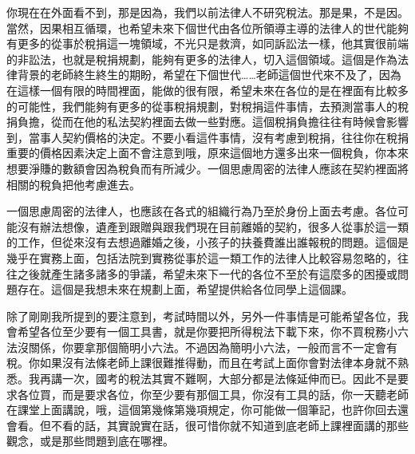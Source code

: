 \documentclass[]{ctexbook}
\begin{document}
你現在在外面看不到，那是因為，我們以前法律人不研究稅法。那是果，不是因。當然，因果相互循環，也希望未來下個世代由各位所領導主導的法律人的世代能夠有更多的從事於稅捐這一塊領域，不光只是救濟，如同訴訟法一樣，他其實很前端的非訟法，也就是稅捐規劃，能夠有更多的法律人，切入這個領域。這個是作為法律背景的老師終生終生的期盼，希望在下個世代\ldots\ldots 老師這個世代來不及了，因為在這樣一個有限的時間裡面，能做的很有限，希望未來在各位的是在裡面有比較多的可能性，我們能夠有更多的從事稅捐規劃，對稅捐這件事情，去預測當事人的稅捐負擔，從而在他的私法契約裡面去做一些對應。這個稅捐負擔往往有時候會影響到，當事人契約價格的決定。不要小看這件事情，沒有考慮到稅捐，往往你在稅捐重要的價格因素決定上面不會注意到哦，原來這個地方還多出來一個稅負，你本來想要淨賺的數額會因為稅負而有所減少。一個思慮周密的法律人應該在契約裡面將相關的稅負把他考慮進去。

一個思慮周密的法律人，也應該在各式的組織行為乃至於身份上面去考慮。各位可能沒有辦法想像，遺產到跟贈與跟我們現在目前離婚的契約，很多人從事於這一類的工作，但從來沒有去想過離婚之後，小孩子的扶養費誰出誰報稅的問題。這個是幾乎在實務上面，包括法院到實務從事於這一類工作的法律人比較容易忽略的，往往之後就產生諸多諸多的爭議，希望未來下一代的各位不至於有這麼多的困擾或問題存在。這個是我想未來在規劃上面，希望提供給各位同學上這個課。

除了剛剛我所提到的要注意到，考試時間以外，另外一件事情是可能希望各位，我會希望各位至少要有一個工具書，就是你要把所得稅法下載下來，你不買稅務小六法沒關係，你要拿那個簡明小六法。不過因為簡明小六法，一般而言不一定會有稅。你如果沒有法條老師上課很難推得動，而且在考試上面你會對法律本身就不熟悉。我再講一次，國考的稅法其實不難啊，大部分都是法條延伸而已。因此不是要求各位買，而是要求各位，你至少要有那個工具，你沒有工具的話，你一天聽老師在課堂上面講說，哦，這個第幾條第幾項規定，你可能做一個筆記，也許你回去還會看。但不看的話，其實說實在話，很可惜你就不知道到底老師上課裡面講的那些觀念，或是那些問題到底在哪裡。
\end{document}
